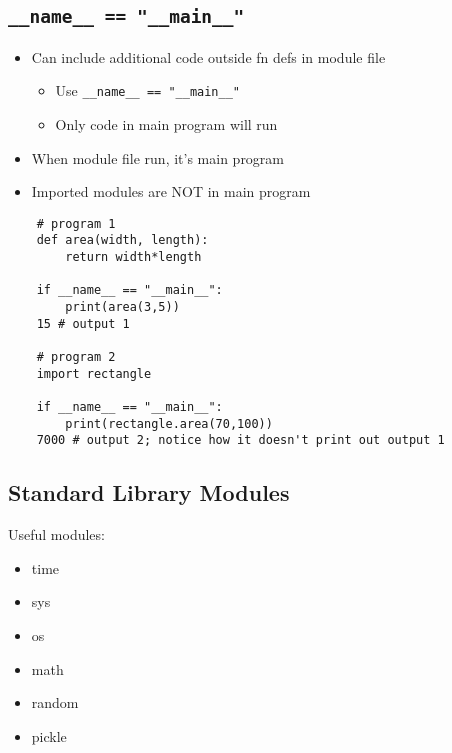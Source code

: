 \documentclass{article}
\begin{document}
\subsection{\texttt{\_\_name\_\_ == "\_\_main\_\_"}}
    \begin{multicols}{2}
        \begin{itemize}
            \item Can include additional code outside fn defs in module file
                \begin{itemize}
                    \item Use \texttt{\_\_name\_\_ == "\_\_main\_\_"}
                    \item Only code in main program will run
                \end{itemize}
            \item When module file run, it's main program
            \item Imported modules are NOT in main program
        \end{itemize}
    \end{multicols}
\vspace{-1em}
\begin{lstlisting}
    # program 1
    def area(width, length):
        return width*length

    if __name__ == "__main__":
        print(area(3,5))
    15 # output 1
    
    # program 2
    import rectangle
    
    if __name__ == "__main__":
        print(rectangle.area(70,100))
    7000 # output 2; notice how it doesn't print out output 1
\end{lstlisting}

\subsection{Standard Library Modules}
    Useful modules:
    \vspace{-1em}
        \begin{multicols}{3}
            \begin{itemize}
                \item time
                \item sys
                \item os
                \item math
                \item random
                \item pickle
            \end{itemize}
        \end{multicols}
\end{document}
